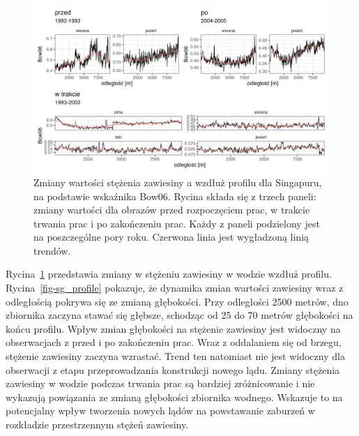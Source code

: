 \documentclass{amuthesis}
\begin{document}
\begin{figure}[t]

{\centering \includegraphics[width=6.77083in,height=\textheight]{figures/singapore/bow_profile.png}

}

\caption{\label{fig-sg_bow_profile}Zmiany wartości stężenia zawiesiny a
wzdłuż profilu dla Singapuru, na podstawie wskaźnika Bow06. Rycina
składa się z trzech paneli: zmiany wartości dla obrazów przed
rozpoczęciem prac, w trakcie trwania prac i po zakończeniu prac. Każdy z
paneli podzielony jest na poszczególne pory roku. Czerwona linia jest
wygładzoną linią trendów.}

\end{figure}

Rycina~\ref{fig-sg_bow_profile} przedstawia zmiany w stężeniu zawiesiny
w wodzie wzdłuż profilu. Rycina~\ref{fig-sg_profile} pokazuje, że
dynamika zmian wartości zawiesiny wraz z odległością pokrywa się ze
zmianą głębokości. Przy odległości 2500 metrów, dno zbiornika zaczyna
stawać się głębsze, schodząc od 25 do 70 metrów głębokości na końcu
profilu. Wpływ zmian głębokości na stężenie zawiesiny jest widoczny na
obserwacjach z przed i po zakończeniu prac. Wraz z oddalaniem się od
brzegu, stężenie zawiesiny zaczyna wzrastać. Trend ten natomiast nie
jest widoczny dla obserwacji z etapu przeprowadzania konstrukcji nowego
lądu. Zmiany stężenia zawiesiny w wodzie podczas trwania prac są
bardziej zróżnicowanie i nie wykazują powiązania ze zmianą głębokości
zbiornika wodnego. Wskazuje to na potencjalny wpływ tworzenia nowych
lądów na powstawanie zaburzeń w rozkładzie przestrzennym stężeń
zawiesiny.
\end{document}
